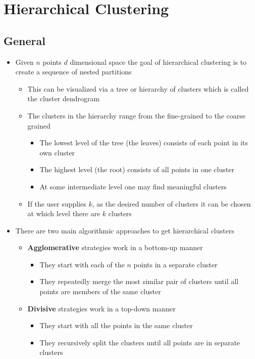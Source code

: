 \documentclass[11pt]{article}
\begin{document}
\section{Hierarchical Clustering}
\label{sec:org6876d33}
\subsection{General}
\label{sec:org5f2a413}
\begin{itemize}
\item Given \(n\) points \(d\) dimensional space the goal of hierarchical clustering is to create a sequence of nested partitions
\begin{itemize}
\item This can be visualized via a tree or hierarchy of clusters which is called the cluster dendrogram
\item The clusters in the hierarchy range from the fine-grained to the coarse grained
\begin{itemize}
\item The lowest level of the tree (the leaves) consists of each point in its own cluster
\item The highest level (the root) consists of all points in one cluster
\item At some intermediate level one may find meaningful clusters
\end{itemize}
\item If the user supplies \(k\), as the desired number of clusters it can be chosen at which level there are \(k\) clusters
\end{itemize}

\item There are two main algorithmic approaches to get hierarchical clusters
\begin{itemize}
\item \textbf{Agglomerative} strategies work in a bottom-up manner
\begin{itemize}
\item They start with each of the \(n\) points in a separate cluster
\item They repeatedly merge the most similar pair of clusters until all points are members of the same cluster
\end{itemize}
\item \textbf{Divisive} strategies work in a top-down manner
\begin{itemize}
\item They start with all the points in the same cluster
\item They recursively split the clusters until all points are in separate clusters
\end{itemize}
\end{itemize}
\end{itemize}
\end{document}
